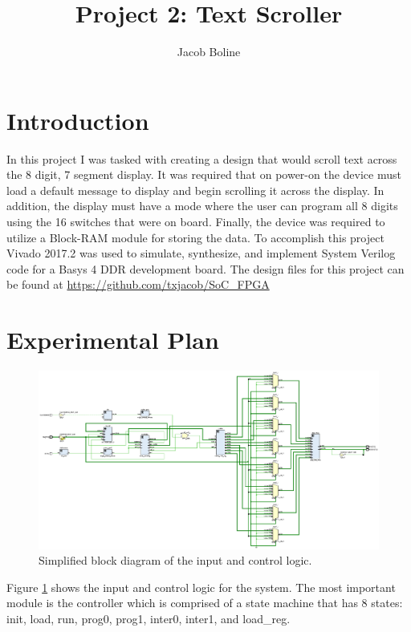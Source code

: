 \documentclass[11pt]{article}
\title{Project 2: Text Scroller}
\author{Jacob Boline}
\begin{document}
\maketitle

\section{Introduction}
In this project I was tasked with creating a design that would scroll text across the 8 digit, 7 segment display. It was required that on power-on the device must load a default message to display and begin scrolling it across the display. In addition, the display must have a mode where the user can program all 8 digits using the 16 switches that were on board. Finally, the device was required to utilize a Block-RAM module for storing the data.  To accomplish this project Vivado 2017.2 was used to simulate, synthesize, and implement System Verilog code for a Basys 4 DDR development board. The design files for this project can be found at \url{https://github.com/txjacob/SoC_FPGA}

\section{Experimental Plan}
\begin{figure}[H]
\includegraphics[trim={0.35cm 6.5cm 11cm 2.75cm},clip,width=7 in]{./figures/schematic.eps}
	\centering
	\caption{Simplified block diagram of the input and control logic.}
	\label{fig:input_logic}
\end{figure}

Figure \ref{fig:input_logic} shows the input and control logic for the system. The most important module is the controller which is comprised of a state machine that has 8 states: init, load, run, prog0, prog1, inter0, inter1, and load\_reg. 
\end{document}
